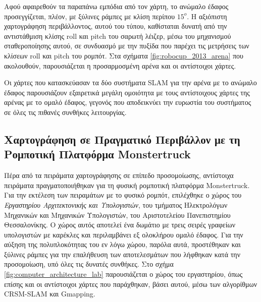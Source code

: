 \bigskip
Αφού αφαιρεθούν τα παραπάνω εμπόδια από τον χάρτη, το ανώμαλο έδαφος προσεγγίζεται, πλέον, με ξύλινες ράμπες με κλίση περίπου $15^o$. Η αξιόπιστη χαρτογράφηση περιβάλλοντος, αυτού του τύπου, καθίσταται δυνατή από την αντιστάθμιση κλίσης roll και pitch του σαρωτή λέιζερ, μέσω του μηχανισμού σταθεροποίησης αυτού, σε συνδυασμό με την πυξίδα που παρέχει τις μετρήσεις των κλίσεων roll και pitch του ρομπότ. Στα σχήματα \ref{fig:robocup_2013_arena} που ακολουθούν, παρουσιάζεται η προσαρμοσμένη αρένα και οι αντίστοιχοι χάρτες.

\bigskip
Οι χάρτες που κατασκεύασαν τα δύο συστήματα SLAM για την αρένα με το ανώμαλο έδαφος παρουσιάζουν εξαιρετικά μεγάλη ομοιότητα με τους αντίστοιχους χάρτες της αρένας με το ομαλό έδαφος, γεγονός που αποδεικνύει την ευρωστία του συστήματος σε όλες τις πιθανές συνθήκες λειτουργίας.

\subsection{Χαρτογράφηση σε Πραγματικό Περιβάλλον με τη Ρομποτική Πλατφόρμα Monstertruck}
Πέρα από τα πειράματα χαρτογράφησης σε επίπεδο προσομοίωσης, αντίστοιχα πειράματα πραγματοποιήθηκαν για τη φυσική ρομποτική πλατφόρμα Monstertruck. Για την εκτέλεση των πειραμάτων με το φυσικό ρομπότ, επιλέχθηκε ο χώρος του \textit{Εργαστηρίου Αρχιτεκτονικής και Υπολογιστών}, του τμήματος Ηλεκτρολόγων Μηχανικών και Μηχανικών Υπολογιστών, του Αριστοτελείου Πανεπιστημίου Θεσσαλονίκης. Ο χώρος αυτός αποτελεί ένα δωμάτιο με τρεις σειρές γραφείων υπολογιστών με καρέκλες και περιλαμβάνει εξ ολοκλήρου ομαλό έδαφος. Για την αύξηση της πολυπλοκότητας του εν λόγω χώρου, παρόλα αυτά, προστέθηκαν και ξύλινες ράμπες για την επαλήθευση των αποτελεσμάτων που λήφθηκαν κατά την προσομοίωση, υπό όλες τις δυνατές συνθήκες.  Στο σχήμα \ref{fig:computer_architecture_lab} παρουσιάζεται ο χώρος του εργαστηρίου, όπως επίσης και οι αντίστοιχοι χάρτες που παράχθηκαν, βάσει αυτού, μέσω των αλγορίθμων CRSM-SLAM και Gmapping.

